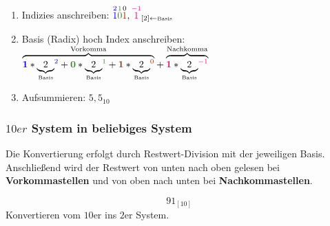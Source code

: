 \documentclass{article}
\begin{document}
\begin{answer}[Lösung]
    \begin{enumerate}[(1)]
        \item Indizies anschreiben:  $\overset{\textcolor{blue}{2}}{\textcolor{blue}{1}}\overset{\textcolor{OliveGreen}{1}}{\textcolor{OliveGreen}{0}}\overset{0}{\textcolor{RawSienna}{1}},{}\overset{\textcolor{RubineRed}{-1}}{\textcolor{RubineRed}{1}}{}_{[2]\leftarrow\text{\tiny Basis}}$
        \item Basis (Radix) hoch Index anschreiben: $\overset{\text{Vorkomma}}{\overbrace{\textcolor{blue}{\boldsymbol{1}}*\underset{\text{\tiny Basis}}{\underbrace{2}}^{\textcolor{blue}{2}}+\textcolor{OliveGreen}{\boldsymbol{0}}*\underset{\text{\tiny Basis}}{\underbrace{2}}^{\textcolor{OliveGreen}{1}}+\textcolor{RawSienna}{\boldsymbol{1}}*\underset{\text{\tiny Basis}}{\underbrace{2}}^{\textcolor{RawSienna}{0}}}}+\overset{\text{Nachkomma}}{\overbrace{\textcolor{RubineRed}{\boldsymbol{1}}*\underset{\text{\tiny Basis}}{\underbrace{2}}^{\textcolor{RubineRed}{-1}}}}$
        \item Aufsummieren:   $5,5_{10}$
    \end{enumerate}
\end{answer}

\subsubsection{$10er$ System in beliebiges System}
Die Konvertierung erfolgt durch Restwert-Division mit der jeweiligen Basis.
Anschließend wird der Restwert von unten nach oben gelesen bei \textbf{Vorkommastellen} und von oben nach unten bei \textbf{Nachkommastellen}.


\begin{question}[Vorkommastellen]
    \begin{equation*}
        91_{[10]}
    \end{equation*}
    Konvertieren vom $10$er ins $2$er System.
\end{question}
\end{document}
